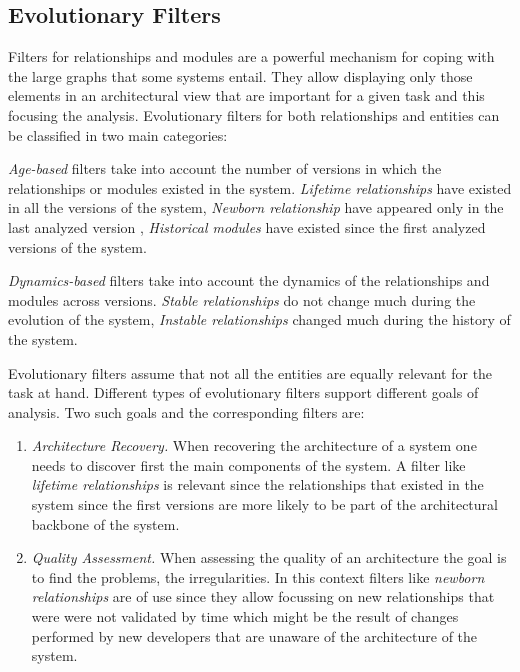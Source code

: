 \documentclass[preprint,12pt]{elsarticle}
\begin{document}
\subsection {Evolutionary Filters}

Filters for relationships and modules are a powerful mechanism for coping with the large graphs that some systems entail. They allow displaying only those elements in an architectural view that are important for a given task and this focusing the analysis. Evolutionary filters for both relationships and entities can be classified in two main categories:

\begin{description}
\item {\em Age-based} filters take into account the number of versions in which the relationships or modules existed in the system. {\em Lifetime relationships} have existed in all the versions of the system, {\em Newborn relationship} have appeared only in the last analyzed version \cite{lungu-relevo}, {\em Historical modules} have existed since the first analyzed versions of the system.
\item {\em Dynamics-based} filters take into account the dynamics of the relationships and modules across versions. {\em Stable relationships} do not change much during the evolution of the system, {\em Instable relationships} changed much during the history of the system.
\end{description}

Evolutionary filters assume that not all the entities are equally relevant for the task at hand. Different types of evolutionary filters support different goals of analysis. Two such goals and the corresponding filters are:

\begin{enumerate}

\item {\em Architecture Recovery.} When recovering the architecture of a system one needs to discover first the main components of the system. A filter like {\em lifetime relationships} is relevant since the relationships that existed in the system since the first versions are more likely to be part of the architectural backbone of the system. %

\item {\em Quality Assessment.} When assessing the quality of an architecture the goal is to find the problems, the irregularities. In this context filters like {\em newborn relationships} are of use since they allow focussing on new relationships that were were not validated by time which might be the result of changes performed by new developers that are unaware of the architecture of the system. %

\end{enumerate}
\end{document}
